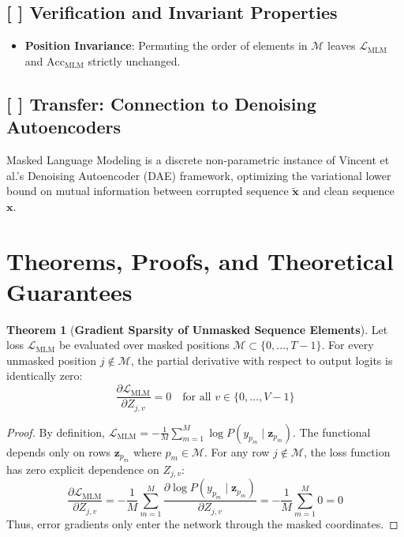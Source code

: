 \documentclass[11pt,a4paper]{article}
\theoremstyle{definition}
\newtheorem{theorem}{\textbf{Theorem}}[section]
\begin{document}
\subsection{[ ] Verification and Invariant Properties}
\begin{itemize}
    \item \textbf{Position Invariance}: Permuting the order of elements in $\mathcal{M}$ leaves $\mathcal{L}_{\text{MLM}}$ and $\text{Acc}_{\text{MLM}}$ strictly unchanged.
\end{itemize}

\subsection{[ ] Transfer: Connection to Denoising Autoencoders}
Masked Language Modeling is a discrete non-parametric instance of Vincent et al.'s Denoising Autoencoder (DAE) framework, optimizing the variational lower bound on mutual information between corrupted sequence $\tilde{\mathbf{x}}$ and clean sequence $\mathbf{x}$.

\section{Theorems, Proofs, and Theoretical Guarantees}

\begin{theorem}[\textbf{Gradient Sparsity of Unmasked Sequence Elements}]
Let loss $\mathcal{L}_{\text{MLM}}$ be evaluated over masked positions $\mathcal{M} \subset \{0, \dots, T-1\}$. For every unmasked position $j \notin \mathcal{M}$, the partial derivative with respect to output logits is identically zero:
{\boldmath
\begin{equation}
\frac{\partial \mathcal{L}_{\text{MLM}}}{\partial Z_{j, v}} = 0 \quad \text{for all } v \in \{0, \dots, V-1\}
\end{equation}
}
\end{theorem}

\begin{proof}
By definition, $\mathcal{L}_{\text{MLM}} = -\frac{1}{M} \sum_{m=1}^M \log P(y_{p_m} \mid \mathbf{z}_{p_m})$.
The functional depends only on rows $\mathbf{z}_{p_m}$ where $p_m \in \mathcal{M}$.
For any row $j \notin \mathcal{M}$, the loss function has zero explicit dependence on $Z_{j, v}$:
{\boldmath
\begin{equation}
\frac{\partial \mathcal{L}_{\text{MLM}}}{\partial Z_{j, v}} = -\frac{1}{M} \sum_{m=1}^M \frac{\partial \log P(y_{p_m} \mid \mathbf{z}_{p_m})}{\partial Z_{j, v}} = -\frac{1}{M} \sum_{m=1}^M 0 = 0
\end{equation}
}
Thus, error gradients only enter the network through the masked coordinates.
\end{proof}
\end{document}
